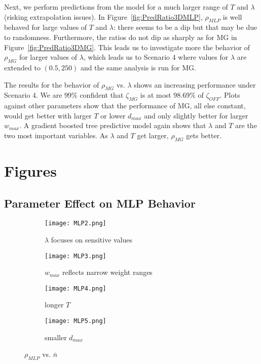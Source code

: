 \documentclass[oribibl]{llncs}
\begin{document}
Next, we perform predictions from the model for a much larger range of $T$ and $\lambda$ (risking extrapolation issues). In Figure~\ref{fig:PredRatio3DMLP}, $\rho_{MLP}$ is well behaved for large values of $T$ and $\lambda$: there seems to be a dip but that may be due to randomness. Furthermore, the ratios do not dip as sharply as for MG in Figure~\ref{fig:PredRatio3DMG}. This leads us to investigate more the behavior of $\rho_{MG}$ for larger values of $\lambda$, which leads us to Scenario 4 where values for $\lambda$ are extended to $(0.5,250)$ and the same analysis is run for MG.

The results for the behavior of $\rho_{MG}$ vs. $\lambda$ shows an increasing performance under Scenario 4. We are 99\% confident that $\zeta_{MG}$ is at most 98.69\% of $\zeta_{OFF}$. Plots against other parameters show that the performance of MG, all else constant, would get better with larger $T$ or lower $d_{max}$ and only slightly better for larger $w_{max}$. A gradient boosted tree predictive model again shows that $\lambda$ and $T$ are the two most important variables. As $\lambda$ and $T$ get larger, $\rho_{MG}$ gets better.






\section{Figures}
\label{app:fig}

\subsection {Parameter Effect on MLP Behavior}
\label{app:MLP}
\vspace{-18pt}
\begin{figure*}[h!]\centering

\begin{subfigure}{.45\textwidth}
  \centering
  \texttt{[image: MLP2.png]}
\caption{ $\lambda$ focuses on sensitive values}
\label{fig:MLP2}
\end{subfigure}
\hfill
\begin{subfigure}{.45\textwidth}
  \centering
  \texttt{[image: MLP3.png]}
\caption{$w_{max}$ reflects narrow weight ranges\\}
\label{fig:MLP3}
\end{subfigure}

\begin{subfigure}{.45\textwidth}
  \centering
  \texttt{[image: MLP4.png]}
  \caption{longer $T$}
  \label{fig:MLP4}
\end{subfigure}
\hfill
\begin{subfigure}{.45\textwidth}
  \centering
  \texttt{[image: MLP5.png]}
  \caption{smaller $d_{max}$}
  \label{fig:MLP5}
\end{subfigure}

\caption{$\rho_{MLP}$ vs. $\bar{n}$}
\label{fig:MLP2345}
\end{figure*}
\end{document}
